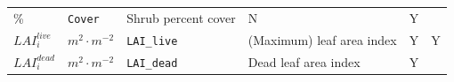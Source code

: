 \documentclass[]{book}
\begin{document}
\begin{longtable}[]{@{}llllll@{}}
\begin{minipage}[t]{0.09\columnwidth}
\%\strut
\end{minipage} & \begin{minipage}[t]{0.06\columnwidth}\raggedright
\texttt{Cover}\strut
\end{minipage} & \begin{minipage}[t]{0.43\columnwidth}\raggedright
Shrub percent cover\strut
\end{minipage} & \begin{minipage}[t]{0.07\columnwidth}\raggedright
N\strut
\end{minipage} & \begin{minipage}[t]{0.07\columnwidth}\raggedright
Y\strut
\end{minipage}\tabularnewline
\begin{minipage}[t]{0.10\columnwidth}\raggedright
\(LAI^{live}_i\)\strut
\end{minipage} & \begin{minipage}[t]{0.09\columnwidth}\raggedright
\(m^2 \cdot m^{-2}\)\strut
\end{minipage} & \begin{minipage}[t]{0.06\columnwidth}\raggedright
\texttt{LAI\_live}\strut
\end{minipage} & \begin{minipage}[t]{0.43\columnwidth}\raggedright
(Maximum) leaf area index\strut
\end{minipage} & \begin{minipage}[t]{0.07\columnwidth}\raggedright
Y\strut
\end{minipage} & \begin{minipage}[t]{0.07\columnwidth}\raggedright
Y\strut
\end{minipage}\tabularnewline
\begin{minipage}[t]{0.10\columnwidth}\raggedright
\(LAI^{dead}_i\)\strut
\end{minipage} & \begin{minipage}[t]{0.09\columnwidth}\raggedright
\(m^2 \cdot m^{-2}\)\strut
\end{minipage} & \begin{minipage}[t]{0.06\columnwidth}\raggedright
\texttt{LAI\_dead}\strut
\end{minipage} & \begin{minipage}[t]{0.43\columnwidth}\raggedright
Dead leaf area index\strut
\end{minipage} & \begin{minipage}[t]{0.07\columnwidth}\raggedright
Y\strut
\end{minipage} & \begin{minipage}[t]{0.07\columnwidth}\raggedright

\end{minipage}
\end{longtable}
\end{document}
